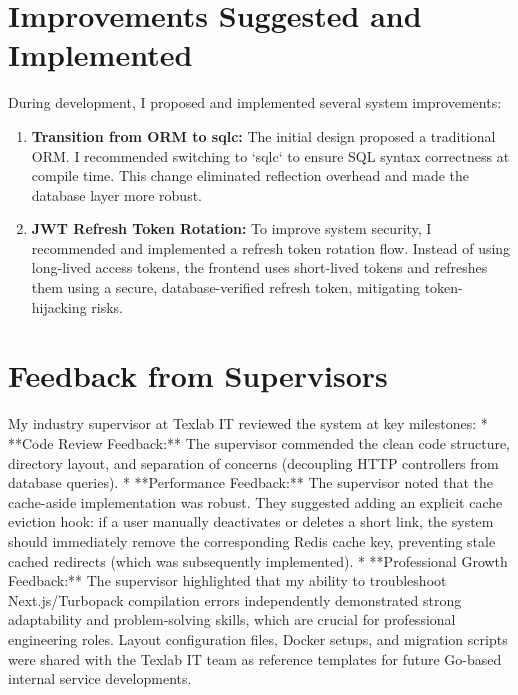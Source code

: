 \section{Improvements Suggested and Implemented}
During development, I proposed and implemented several system improvements:
\begin{enumerate}
    \item \textbf{Transition from ORM to sqlc:} The initial design proposed a traditional ORM. I recommended switching to `sqlc` to ensure SQL syntax correctness at compile time. This change eliminated reflection overhead and made the database layer more robust.
    \item \textbf{JWT Refresh Token Rotation:} To improve system security, I recommended and implemented a refresh token rotation flow. Instead of using long-lived access tokens, the frontend uses short-lived tokens and refreshes them using a secure, database-verified refresh token, mitigating token-hijacking risks.
\end{enumerate}

\section{Feedback from Supervisors}
My industry supervisor at Texlab IT reviewed the system at key milestones:
*   **Code Review Feedback:** The supervisor commended the clean code structure, directory layout, and separation of concerns (decoupling HTTP controllers from database queries).
*   **Performance Feedback:** The supervisor noted that the cache-aside implementation was robust. They suggested adding an explicit cache eviction hook: if a user manually deactivates or deletes a short link, the system should immediately remove the corresponding Redis cache key, preventing stale cached redirects (which was subsequently implemented).
*   **Professional Growth Feedback:** The supervisor highlighted that my ability to troubleshoot Next.js/Turbopack compilation errors independently demonstrated strong adaptability and problem-solving skills, which are crucial for professional engineering roles.
Layout configuration files, Docker setups, and migration scripts were shared with the Texlab IT team as reference templates for future Go-based internal service developments.
